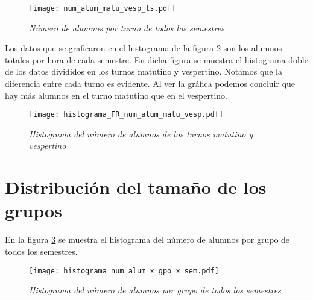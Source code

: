 \begin{figure}[H]
\centering
\texttt{[image: num\_alum\_matu\_vesp\_ts.pdf]} %
\caption{\textit{Número de alumnos por turno de todos los semestres}}\label{NumAlTotal_MatuVesp_ts}
\end{figure}



Los datos que se graficaron en el histograma de la figura \ref{histNumAlTotal_MatuVesp} son los alumnos totales por hora de cada semestre. En dicha figura se muestra el histograma doble de los datos divididos en los turnos matutino y vespertino. Notamos que la diferencia entre cada turno es evidente. Al ver la gráfica podemos concluir que hay más alumnos en el turno matutino que en el vespertino.

\begin{figure}[H]
\centering
\texttt{[image: histograma\_FR\_num\_alum\_matu\_vesp.pdf]} %
\caption{\textit{Histograma del número de alumnos de los turnos matutino y vespertino}}\label{histNumAlTotal_MatuVesp}
\end{figure}





\section{Distribución del tamaño de los grupos} \label{DitribTamGpos}
En la figura \ref{histNumAl_x_gpo_x_sem} se muestra el histograma del número de alumnos por grupo de todos los semestres. %

\begin{figure}[H]
\centering
\texttt{[image: histograma\_num\_alum\_x\_gpo\_x\_sem.pdf]} %
\caption{\textit{Histograma del número de alumnos por grupo de todos los semestres}}\label{histNumAl_x_gpo_x_sem}
\end{figure}


